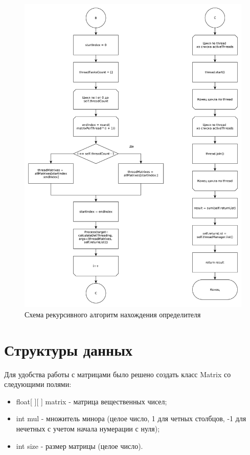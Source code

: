\documentclass[12pt]{report}
\begin{document}
    \begin{figure}[H]
        \centering
        \includegraphics[width=0.90\linewidth]{img/solver_part_2}
        \caption{
            Схема рекурсивного алгоритм нахождения определителя
        }
        \label{img:solver_2}
    \end{figure}

	\section{Структуры данных}
	Для удобства работы с матрицами было решено создать класс Matrix со следующими полями:
	\begin{itemize}
		\item float{[ ][ ]} matrix - матрица вещественных чисел;
		\item int mul - множитель минора (целое число, 1 для четных столбцов, -1 для нечетных с учетом начала нумерации с нуля);
		\item int size - размер матрицы (целое число).
	\end{itemize}
	
\end{document}
